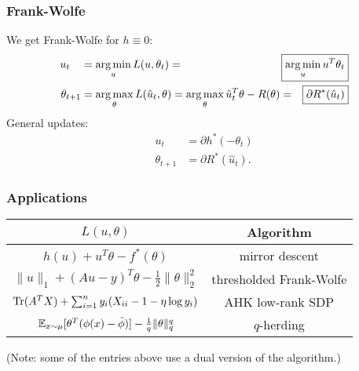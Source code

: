 \documentclass{beamer}
\begin{document}
\begin{frame}
\frametitle{Frank-Wolfe}
\reminder
We get Frank-Wolfe for $h \equiv 0$:
\begin{align*}
u_t\,\,\,\,\,\, &= \argmin_u L(u, \theta_t) = \Aboxed{\argmin_u u^T\theta_t} \\
\theta_{t+1}    &= \argmax_{\theta} L(\hat{u}_t, \theta) = \argmax_{\theta} \hat{u}_t^T\theta - R(\theta) = \Aboxed{\partial R^*(\hat{u}_t)}
\end{align*}
\pause
General updates:
\begin{align*}
u_t\,\,\,\,\,\, &= \partial h^*(-\theta_t) \\
\theta_{t+1} &= \partial R^*(\hat{u}_t).
\end{align*}
\end{frame}

\begin{frame}
\frametitle{Applications}
\begin{tabular}{|c|c|}
\hline
$L(u,\theta)$ & Algorithm \\ \hline
$h(u) + u^T\theta - f^*(\theta)$ & mirror descent \\ \hline
$\|u\|_1 + (Au-y)^T\theta - \frac{1}{2}\|\theta\|_2^2$ & thresholded Frank-Wolfe \\ \hline
$\operatorname{Tr}(A^TX) + \sum_{i=1}^n y_i(X_{ii} -1 -\eta \log y_i)$ & AHK low-rank SDP \\ \hline
$\mathbb{E}_{x \sim \mu}[\theta^T(\phi(x)-\bar{\phi})] - \frac{1}{q}\|\theta\|_q^q$ & $q$-herding \\ \hline
\end{tabular}
(Note: some of the entries above use a dual version of the algorithm.)
\end{frame}
\end{document}
